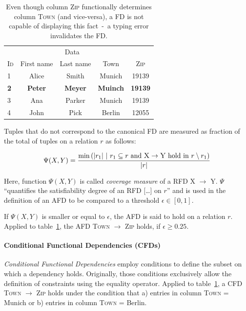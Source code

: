 \begin{table}[ht]
    \centering
    \begin{tabular}{lcccc}
        \toprule
        & \multicolumn{3}{c}{Data} \\ \cmidrule(lr){2-5}
        \textsc{Id} & First name & Last name & Town & \textsc{Zip} \\
        \midrule
        1 & Alice & Smith & Munich & 19139 \\
        \textbf{2} & \textbf{Peter}& \textbf{Meyer} &
        \textbf{Muinch} & \textbf{19139} \\
        3 & Ana & Parker & Munich & 19139  \\
        4 & John & Pick & Berlin & 12055 \\
        \bottomrule
    \end{tabular}
    \caption{Even though column \textsc{Zip} functionally determines column \textsc{Town} (and vice-versa), a FD is not capable of displaying this fact~-~a typing error invalidates the FD.}
    \label{tab:example-afd-necessity}
\end{table}

Tuples that do not correspond to the canonical FD are measured as fraction of the total of tuples on a relation \( r \) as follows:

\begin{align}
    \Psi(X, Y) = \frac{\min{\left(|r_1|~|~r_1 \subseteq r \text{ and } \textsc{X} \rightarrow \textsc{Y} \text{ hold in } r \setminus r_1 \right)}}{|r|}
\end{align}

Here, function \( \Psi(X, Y) \) is called \emph{coverage measure} of a RFD \textsc{X} \( \to \) \textsc{Y}.
\( \Psi \) ``quantifies the satisfiability degree of an RFD [\dots] on \( r \)''\cite[p.~150]{CAR16} and is used in the definition of an AFD to be compared to a threshold \( \epsilon \in [0, 1] \).

If \( \Psi(X, Y) \) is smaller or equal to \( \epsilon \), the AFD is said to hold on a relation \( r \).
Applied to table~\ref{tab:example-afd-necessity}, the AFD \textsc{Town} \(\to\) \textsc{\textsc{Zip}} holds, if \( \epsilon \geq 0.25\).

\paragraph{Conditional Functional Dependencies (CFDs)}
\emph{Conditional Functional Dependencies} employ conditions to define the subset on which a dependency holds.
Originally, those conditions exclusively allow the definition of constraints using the equality operator.\cite[p.~152]{CAR}
Applied to table~\ref{tab:example-afd-necessity}, a CFD \textsc{Town} \(\to\) \textsc{\textsc{Zip}} holds under the condition that a) entries in column \textsc{Town} = Munich or b) entries in column \textsc{Town} = Berlin.

